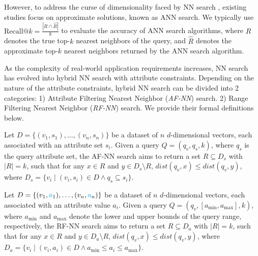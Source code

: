 \documentclass[sigconf, nonacm]{acmart}
\begin{document}
{	However, to address the curse of dimensionality faced by NN search \cite{dimcurse}, existing studies focus on approximate solutions, known as ANN  search. We typically use $\text{Recall}@k = \frac{|R \cap \hat{R}|}{k}$ to evaluate the accuracy of ANN search algorithms, where $R$ denotes the true top-$k$ nearest neighbors of the query, and $\hat{R}$ denotes the approximate top-$k$ nearest neighbors returned by the ANN search algorithm.
	
	As the complexity of real-world application requirements increases, NN search has evolved into hybrid NN search with attribute constraints. Depending on the nature of the attribute constraints, hybrid NN search can be divided into 2 categories: 1) Attribute Filtering Nearest Neighbor (\textit{AF-NN}) search. 2) Range Filtering Nearest Neighbor (\textit{RF-NN}) search. We provide their formal definitions below.
	
	\begin{definition}[AF-NN Search]
		Let \( D = \{(v_1, s_1), \ldots, (v_n, s_n)\} \) be a dataset of \( n \) \( d \)-dimensional vectors, each associated with an attribute set \( s_i \). Given a query \( Q = (q_v, q_s, k) \), where \( q_s \) is the query attribute set, the AF-NN search aims to return a set \( R \subseteq D_s \) with \( |R| = k \), such that for any \( x \in R \) and \( y \in D_s \setminus R \), \( \textit{dist}(q_v, x) \leq \textit{dist}(q_v, y) \), where \( D_s = \{ v_i \mid (v_i, s_i) \in D \land q_s \subseteq s_i \} \).
	\end{definition}
	
	
	\begin{definition}[RF-NN Search]
		
		Let \( D = \{(v_1, \textcolor{cyan}{a}_1), \ldots, (v_n, \textcolor{cyan}{a}_n)\} \) be a dataset of \( n \) \( d \)-dimensional vectors, each associated with an attribute value \( a_i \). Given a query \( Q = (q_v, [a_{\min}, a_{\max}], k) \), where \( a_{\min} \) and \( a_{\max} \) denote the lower and upper bounds of the query range, respectively, the RF-NN search aims to return a set \( R \subseteq D_a \) with \( |R| = k \), such that for any \( x \in R \) and \( y \in D_a \setminus R \), \( \textit{dist}(q_v, x) \leq \textit{dist}(q_v, y) \), where \( D_a = \{ v_i \mid (v_i, a_i) \in D \land a_{\min} \leq a_i \leq a_{\max} \} \).
	\end{definition}
	
}
\end{document}
